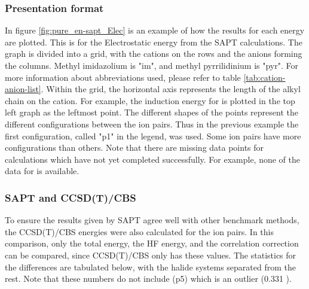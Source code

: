 \begin{multicols}{2}

\subsubsection{Presentation format}
In
figure \ref{fig:pure_en-sapt_Elec}
is an example of how the results for each energy are plotted. 
This is for the Electrostatic energy from the SAPT calculations.
The graph is divided into a grid, with the cations on the rows and the anions forming the columns. 
Methyl imidazolium is "im", and methyl pyrrilidinium is "pyr". 
For more information about abbreviations used, please refer to 
table \ref{tab:cation-anion-list}.
Within the grid, the horizontal axis represents the length of the alkyl chain on the cation. 
For example, the induction energy for 
is plotted in the top left graph as the leftmost point.
The different shapes of the points represent the different configurations between the ion pairs. 
Thus in the previous example the first configuration, called "p1" in the legend, was used.
Some ion pairs have more configurations than others. 
Note that there are missing data points for calculations which have not yet completed successfully. 
For example, none of the data for 
is available.


\subsubsection{SAPT and CCSD(T)/CBS}

To ensure the results given by SAPT agree well with other benchmark methods, the CCSD(T)/CBS energies were also calculated for the ion pairs. 
In this comparison, only the total energy, the HF energy, and the correlation correction can be compared, since CCSD(T)/CBS only has these values. 
The statistics for the differences are tabulated below, with the halide systems separated from the rest.
Note that these numbers do not include  (p5) which is an outlier (0.331 \enUnit).

\end{multicols}


